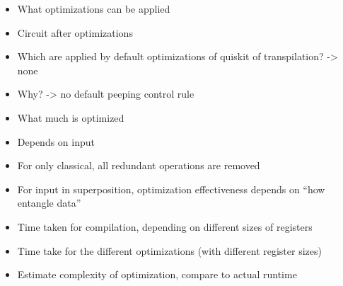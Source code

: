 \begin{itemize}
    \item What optimizations can be applied
    \item Circuit after optimizations
    \item Which are applied by default optimizations of quiskit of transpilation? -> none
    \item Why? -> no default peeping control rule
    \item What much is optimized
    \item Depends on input
    \item For only classical, all redundant operations are removed
    \item For input in superposition, optimization effectiveness depends on ``how entangle data''
\end{itemize}

\begin{itemize}
    \item Time taken for compilation, depending on different sizes of registers
    \item Time take for the different optimizations (with different register sizes)
    \item Estimate complexity of optimization, compare to actual runtime
\end{itemize}
